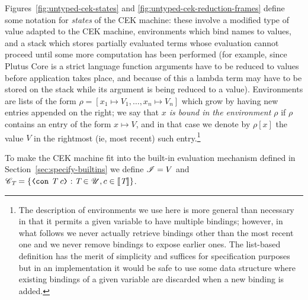 

\noindent Figures~\ref{fig:untyped-cek-states} and \ref{fig:untyped-cek-reduction-frames}
define some notation for \textit{states} of the CEK machine: these involve a
modified type of value adapted to the CEK machine, environments which bind names
to values, and a stack which stores partially evaluated terms whose evaluation
cannot proceed until some more computation has been performed (for example,
since Plutus Core is a strict language function arguments have to be reduced to
values before application takes place, and because of this a lambda term may
have to be stored on the stack while its argument is being reduced to a value).
Environments are lists of the form $\rho = [x_1 \mapsto V_1, \ldots, x_n \mapsto
  V_n]$ which grow by having new entries appended on the right; we say that
\textit{$x$ is \textit{bound} in the environment $\rho$} if $\rho$ contains an
entry of the form $x \mapsto V$, and in that case we denote by $\rho[x]$ the
value $V$ in the rightmost (ie, most recent) such entry.\footnote{The
  description of environments we use here is more general than necessary in that
  it permits a given variable to have multiple bindings; however, in what
  follows we never actually retrieve bindings other than the most recent one and
  we never remove bindings to expose earlier ones.  The list-based definition
  has the merit of simplicity and suffices for specification purposes but in an
  implementation it would be safe to use some data structure where existing
  bindings of a given variable are discarded when a new binding is added.}

To make the CEK machine fit into the built-in evaluation mechanism defined in
Section~\ref{sec:specify-builtins} we define $\mathscr{I} = V$ and $\Con{\tn} =
\{\VCon{\tn}{c} : \tn \in \Uni, c \in \denote{\tn}\}$.

